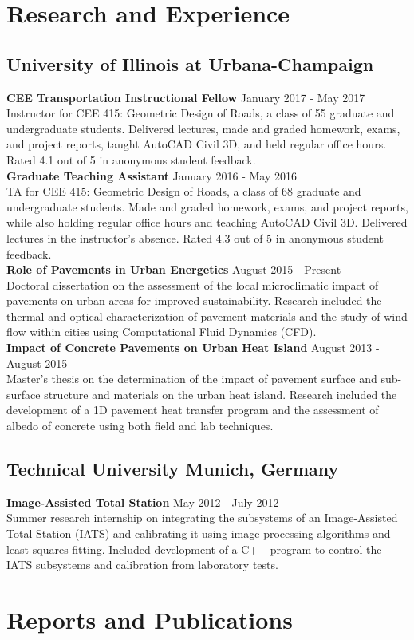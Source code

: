 \documentclass[12pt]{article}
\begin{document}
\section*{Research and Experience}
\subsection*{University of Illinois at Urbana-Champaign}
\textbf{CEE Transportation Instructional Fellow} \hfill January 2017 - May 2017 \\
Instructor for CEE 415: Geometric Design of Roads, a class of 55 graduate and undergraduate students. Delivered lectures, made and graded homework, exams, and project reports, taught AutoCAD Civil 3D, and held regular office hours. Rated 4.1 out of 5 in anonymous student feedback. \\

\textbf{Graduate Teaching Assistant} \hfill January 2016 - May 2016 \\
TA for CEE 415: Geometric Design of Roads, a class of 68 graduate and undergraduate students. Made and graded homework, exams, and project reports, while also holding regular office hours and teaching AutoCAD Civil 3D. Delivered lectures in the instructor’s absence. Rated 4.3 out of 5 in anonymous student feedback. \\

\textbf{Role of Pavements in Urban Energetics} \hfill August 2015 - Present \\
Doctoral dissertation on the assessment of the local microclimatic impact of pavements on urban areas for improved sustainability. Research included the thermal and optical characterization of pavement materials and the study of wind flow within cities using Computational Fluid Dynamics (CFD). \\

\textbf{Impact of Concrete Pavements on Urban Heat Island} \hfill August 2013 - August 2015 \\
Master's thesis on the determination of the impact of pavement surface and sub-surface structure and materials on the urban heat island. Research included the development of a 1D pavement heat transfer program and the assessment of albedo of concrete using both field and lab techniques.\\

\subsection*{Technical University Munich, Germany}
\textbf{Image-Assisted Total Station} \hfill May 2012 - July 2012 \\
Summer research internship on integrating the subsystems of an Image-Assisted Total Station (IATS) and calibrating it using image processing algorithms and least squares fitting. Included development of a C++ program to control the IATS subsystems and calibration from laboratory tests.\\

\section*{Reports and Publications}
\end{document}
